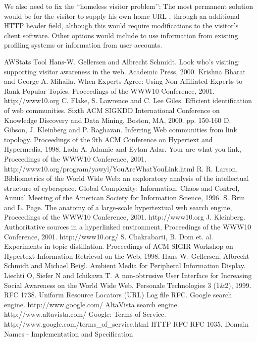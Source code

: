 \documentclass[a4paper]{danarticle}
\theoremstyle{remark}
\begin{document}
    We also need
    to fix the \lq\lq homeless visitor problem\rq\rq : The most permanent
    solution would be for the visitor to supply his own home URL \cite{webaware},
    through an additional HTTP header field, although this would require
    modifications to the visitor's client software. Other options would include
    to use information from existing profiling systems or
    information from user accounts.
  \newpage    
  \begin{thebibliography}{99}
     AWStats Tool
     Hans-W. Gellersen and Albrecht Schmidt.
    Look who's visiting: supporting visitor awareness in the web.
    Academic Press, 2000.
     Krishna Bharat and George A. Mihaila.
     When Experts Agree: Using Non-Affiliated Experts to Rank Popular Topics,
     Proceedings of the WWW10 Conference, 2001.
     http://www10.org
     C. Flake, S. Lawrence and C. Lee Giles.
    Efficient identification of web communities.
    Sixth ACM SIGKDD International Conference on Knowledge Discovery and Data 
    Mining, Boston, MA, 2000. 
    pp. 150-160
     D. Gibson, J. Kleinberg and P. Raghavan.
    Inferring Web communities from link topology.
    Proceedings of the 9th ACM Conference on Hypertext and Hypermedia, 1998.
     Lada A. Adamic and Eytan Adar.
    Your are what you link, Proceedings of the WWW10 Conference, 2001.
    http://www10.org/program/yawyl/YouAreWhatYouLink.html
     R. R. Larson.
    Bibliometrics of the World Wide Web: an exploratory analysis of the
    intellectual structure of cyberspace.
    Global Complexity: Information, Chaos and Control, Annual Meeting of the
    American Society for Information Science, 1996.
     S. Brin and L. Page.
    The anatomy of a large-scale hypertextual web search engine, 
    Proceedings of the WWW10 Conference, 2001.
    http://www10.org
     J. Kleinberg.
    Authoritative sources in a hyperlinked environment, Proceedings of the WWW10
    Conference, 2001.
    http://www10.org/
     S. Chakrabarti, B. Dom et. al.
    Experiments in topic distillation.
    Proceedings of ACM SIGIR Workshop on Hypertext Information Retrieval on
    the Web, 1998.
     Hans-W. Gellersen, Albrecht Schmidt and Michael Beigl.
    Ambient Media for Peripheral Information Display.
     Liechti O, Siefer N and Ichikawa T.
    A non-obtrusive User Interface for Increasing Social Awareness on the 
    World Wide Web. Personale Technologies 3 (1\&2), 1999.
     RFC 1738. Uniform Resource Locators (URL) 
     Log file RFC.
     Google search engine. http://www.google.com/
     AltaVista search engine. http://www.altavista.com/
     Google: Terms of Service.
    http://www.google.com/terms\_of\_service.html
     HTTP RFC
     RFC 1035. Domain Names - Implementation and Specification
  \end{thebibliography}
\end{document}
